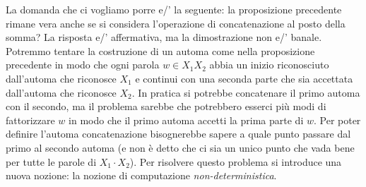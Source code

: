 La domanda che ci vogliamo porre e/' la seguente:
la proposizione precedente rimane vera anche se si 
considera l'operazione di concatenazione al posto della somma?
La risposta e/' affermativa, ma la dimostrazione non e/' banale.
Potremmo tentare la costruzione di un automa come nella proposizione precedente in modo che ogni parola $w\in X_1X_2$ abbia un inizio riconosciuto dall'automa che riconosce $X_1$ e continui con una seconda parte che sia accettata dall'automa che riconosce $X_2$. In pratica si potrebbe concatenare il primo automa con il secondo, ma il problema sarebbe che potrebbero esserci più modi di fattorizzare $w$ in modo che il primo automa accetti la prima parte di $w$. Per poter definire l'automa concatenazione bisognerebbe sapere a quale punto passare dal primo al secondo automa (e non è detto che ci sia un unico punto che vada bene per tutte le parole di $X_1\cdot X_2$). Per risolvere questo problema si introduce una nuova nozione: la nozione di computazione \emph{non-deterministica}.